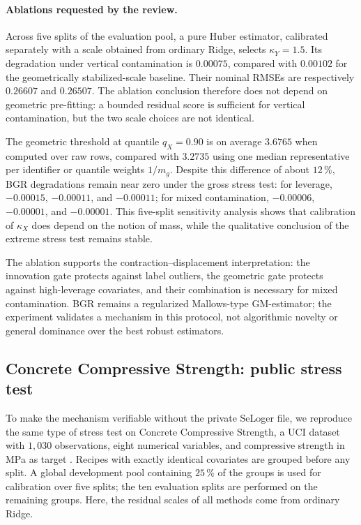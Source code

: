 \documentclass[10pt,a4paper]{article}
\begin{document}
\paragraph{Ablations requested by the review.}
Across five splits of the evaluation pool, a pure Huber estimator, calibrated separately with a scale obtained from ordinary Ridge, selects $\kappa_Y=1.5$. Its degradation under vertical contamination is $0.00075$, compared with $0.00102$ for the geometrically stabilized-scale baseline. Their nominal RMSEs are respectively $0.26607$ and $0.26507$. The ablation conclusion therefore does not depend on geometric pre-fitting: a bounded residual score is sufficient for vertical contamination, but the two scale choices are not identical.

The geometric threshold at quantile $q_X=0.90$ is on average $3.6765$ when computed over raw rows, compared with $3.2735$ using one median representative per identifier or quantile weights $1/m_g$. Despite this difference of about $12\,\%$, BGR degradations remain near zero under the gross stress test: for leverage, $-0.00015$, $-0.00011$, and $-0.00011$; for mixed contamination, $-0.00006$, $-0.00001$, and $-0.00001$. This five-split sensitivity analysis shows that calibration of $\kappa_X$ does depend on the notion of mass, while the qualitative conclusion of the extreme stress test remains stable.

The ablation supports the contraction--displacement interpretation: the innovation gate protects against label outliers, the geometric gate protects against high-leverage covariates, and their combination is necessary for mixed contamination. BGR remains a regularized Mallows-type GM-estimator; the experiment validates a mechanism in this protocol, not algorithmic novelty or general dominance over the best robust estimators.

\subsection{Concrete Compressive Strength: public stress test}
To make the mechanism verifiable without the private SeLoger file, we reproduce the same type of stress test on Concrete Compressive Strength, a UCI dataset with $1{,}030$ observations, eight numerical variables, and compressive strength in MPa as target \citep{yeh1998concrete}. Recipes with exactly identical covariates are grouped before any split. A global development pool containing $25\,\%$ of the groups is used for calibration over five splits; the ten evaluation splits are performed on the remaining groups. Here, the residual scales of all methods come from ordinary Ridge.
\end{document}
